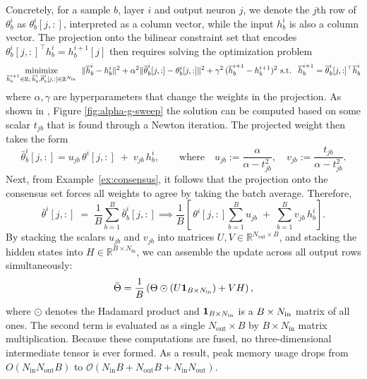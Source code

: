 \documentclass{article}
\let\cref\crtcref
\DeclareMathOperator*{\minimize}{minimize}
\begin{document}
Concretely, for a sample $b$, layer $i$ and output neuron $j$, we denote the $j$th row of $\theta_b^i$ as $\theta^{i}_b[j,:]$, interpreted as a column vector, while the input $h^{i}_{b}$ is also a column vector. The projection onto the bilinear constraint set that encodes $\theta^{i}_b[j,:]^\top h^{i}_{b} = h^{i+1}_{b}[j]$ then requires solving the optimization problem
\[
     \minimize_{\overline{h}^{i+1}_b\in\mathbb{R};\,\overline{h}^i_b,\overline{\theta}_b^i[j,:]\in\mathbb{R}^{N_{\rm in}}}\; \ \lVert \overline{h}^i_b-h^i_b\rVert^2 + \alpha^2\lVert \overline{\theta}_b^i[j,:]-{\theta}_b^i[j,:]\rVert^2 + \gamma^2\,(\overline{h}^{i+1}_b-h^{i+1}_b)^2 \text{ s.t. } \ \overline{h}^{i+1}_b = \overline{\theta}_b^i[j,:]^\top \overline{h}^i_b
\]
where $\alpha, \gamma$ are hyperparameters that change the weights in the projection. As shown in \cref{sec:proj-mechanics}, Figure \ref{fig:alpha-g-sweep} the solution can be computed based on some scalar $t_{jb}$ that is found through a Newton iteration. The projected weight then takes the form
\[
    \bar\theta^{i}_{b}[j,:] = u_{jb}\,\theta^{i}[j,:] \;+\; v_{jb}\, h^{i}_{b}{}, \qquad \text{where} \quad u_{jb} := \frac{\alpha}{\alpha - t_{jb}^{2}}, \quad v_{jb} := \frac{t_{jb}}{\alpha - t_{jb}^{2}}.
\]
Next, from Example~\ref{ex:consensus}, it follows that the projection onto the consensus set forces all weights to agree by taking the batch average. Therefore,
\[
    \bar\theta^{i}[j,:] \;=\; \frac{1}{B} \sum_{b=1}^{B} \bar\theta^{i}_{b}[j,:] \implies    \frac{1}{B}\!\left[\, \theta^{i}[j,:] \sum_{b=1}^{B} u_{jb} \;+\; \sum_{b=1}^{B} v_{jb}\, h^{i}_{b}{} \right].
\]
By stacking the scalars $u_{jb}$ and $v_{jb}$ into matrices $U, V \in \mathbb{R}^{N_{\mathrm{out}} \times B}$, and stacking the hidden states into $H \in \mathbb{R}^{B \times N_{\mathrm{in}}}$, we can assemble the update across all output rows simultaneously:
\[
    \bar{\Theta} = \frac{1}{B} \left( \Theta \odot (U\mathbf{1}_{B\times N_{\rm in}}) + V H \right),
\]
where $\odot$ denotes the Hadamard product and $\mathbf{1}_{B\times N_{\rm in}}$ is a $B\times N_{\rm in}$ matrix of all ones. The second term is evaluated as a single $N_{\mathrm{out}} \times B$ by $B \times N_{\mathrm{in}}$ matrix multiplication. Because these computations are fused, no three-dimensional intermediate tensor is ever formed. As a result, peak memory usage drops from $O(N_{\mathrm{in}}N_{\mathrm{out}}B)$ to $\mathcal{O}(N_{\mathrm{in}}B + N_{\mathrm{out}}B + N_{\mathrm{in}}N_{\mathrm{out}})$.
\end{document}
